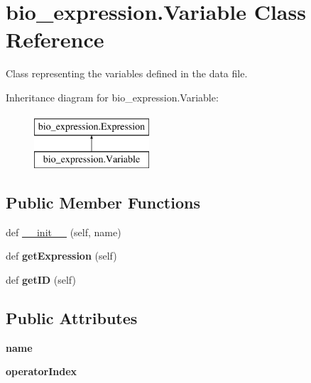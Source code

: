 \hypertarget{classbio__expression_1_1_variable}{}\section{bio\+\_\+expression.\+Variable Class Reference}
\label{classbio__expression_1_1_variable}


Class representing the variables defined in the data file.  


Inheritance diagram for bio\+\_\+expression.\+Variable\+:\begin{figure}[H]
\begin{center}
\leavevmode
\includegraphics[height=2.000000cm]{classbio__expression_1_1_variable}
\end{center}
\end{figure}
\subsection*{Public Member Functions}
\begin{DoxyCompactItemize}
\item 
def \hyperlink{classbio__expression_1_1_variable_a9ddd515dd1730f0ab4b1df8bdca73a33}{\+\_\+\+\_\+init\+\_\+\+\_\+} (self, name)
\item 
def {\bfseries get\+Expression} (self)\hypertarget{classbio__expression_1_1_variable_a2d7164db3fd9487f4a89ad82878793c2}{}\label{classbio__expression_1_1_variable_a2d7164db3fd9487f4a89ad82878793c2}

\item 
def {\bfseries get\+ID} (self)\hypertarget{classbio__expression_1_1_variable_ac794b6e3ee236e02a827fbcc4b49c4b0}{}\label{classbio__expression_1_1_variable_ac794b6e3ee236e02a827fbcc4b49c4b0}

\end{DoxyCompactItemize}
\subsection*{Public Attributes}
\begin{DoxyCompactItemize}
\item 
{\bfseries name}\hypertarget{classbio__expression_1_1_variable_a58b8146722379546bf5bce3c39b549cd}{}\label{classbio__expression_1_1_variable_a58b8146722379546bf5bce3c39b549cd}

\item 
{\bfseries operator\+Index}\hypertarget{classbio__expression_1_1_variable_a5dd1818c0fe6bdb02a267a923aad2697}{}\label{classbio__expression_1_1_variable_a5dd1818c0fe6bdb02a267a923aad2697}

\end{DoxyCompactItemize}


